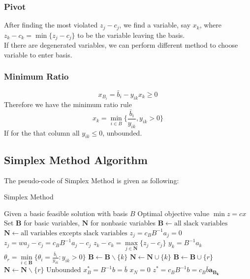  				\subsubsection{Pivot}
 					After finding the most violated $z_j - c_j$, we find a variable, say $x_k$, where $z_k - c_k = \min \{z_j - c_j\}$ to be the variable leaving the basis. \\
 					If there are degenerated variables, we can perform different method to choose variable to enter basis.

 				\subsubsection{Minimum Ratio}
 					\begin{equation}
 						x_{B_i} = \bar{b}_i - y_{ik}x_k \ge 0 
 					\end{equation}
 					Therefore we have the minimum ratio rule
 					\begin{equation}
 						x_k = \min_{i \in B} \{\frac{\bar{b}_i}{y_{ik}}, y_{ik} > 0\} 
 					\end{equation}
 					If for the that column all $y_{ik} \le 0$, unbounded.

			\subsection{Simplex Method Algorithm}
				The pseudo-code of Simplex Method is given as following:
				\begin{algorithm}[h!]
					\caption{Simplex Method}
					\begin{algorithmic}[1]
						\REQUIRE Given a basic feasible solution with basis $B$
						\ENSURE Optimal objective value $\min z= cx$
						\STATE Set $\mathbf{B}$ for basic variables, $\mathbf{N}$ for nonbasic variables
						\STATE $\mathbf{B} \gets \text{all slack variables}$
						\STATE $\mathbf{N} \gets \text{all variables excepts slack variables}$
							\STATE $z_j=c_BB^{-1}a_j=0$				
						\ENDFOR
							\STATE $z_j=wa_j-c_j=c_BB^{-1}a_j-c_j$
							\STATE $z_k-c_k=\max\limits_{j \in \mathbf{N}}\{z_j-c_j\}$
							\STATE $y_k=B^{-1}a_k$
								\STATE $\theta_r=\min\limits_{i \in \mathbf{B}}\{\theta_i=\frac{\bar{b}_i}{y_{ik}}:y_{ik}>0\}$
								\STATE $\mathbf{B} \gets \mathbf{B} \backslash \{k\}$
								\STATE $\mathbf{N} \gets \mathbf{N} \cup \{k\}$
								\STATE $\mathbf{B} \gets \mathbf{B} \cup \{r\}$
								\STATE $\mathbf{N} \gets \mathbf{N} \backslash \{r\}$
							\ELSE
								\STATE Unbounded
							\ENDIF
						\ENDWHILE
						\STATE $x_B^*=B^{-1}b=\bar{b}$
						\STATE $x_N=0$
						\STATE $z^*=c_BB^{-1}b=c_B\bar{b}\mathbf{a_{B_k}}$
					\end{algorithmic}
				\end{algorithm}


